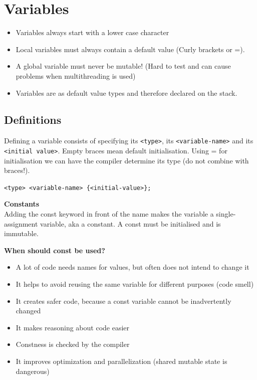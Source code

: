
\section{Variables}
\begin{itemize}
  \itemsep -0.5em 
  \item Variables always start with a lower case character
  \item Local variables must always contain a default value (Curly brackets or =).
  \item A global variable must never be mutable! (Hard to test and can cause problems when multithreading is used)
  \item Variables are as default value types and therefore declared on the stack.
\end{itemize}

\subsection{Definitions}
Defining a variable consists of specifying its \lstinline|<type>|, its \lstinline|<variable-name>| and its \lstinline|<initial value>|. Empty braces mean default initialisation. Using = for initialisation we can have the compiler determine its type (do not combine with braces!).
\begin{center}
	\lstinline|<type> <variable-name> {<initial-value>};|
\end{center}
\textbf{Constants}\\
 Adding the const keyword in front of the name makes the variable a single-assignment variable, aka a constant. A const must be initialised and is immutable.

\textbf{When should const be used?}
\begin{itemize}
  \itemsep -0.5em 
  \item A lot of code needs names for values, but often does not intend to change it
  \item  It helps to avoid reusing the same variable for different purposes (code smell)
  \item  It creates safer code, because a const variable cannot be inadvertently changed
  \item It makes reasoning about code easier
  \item  Constness is checked by the compiler
  \item  It improves optimization and parallelization (shared mutable state is dangerous) 
\end{itemize}

